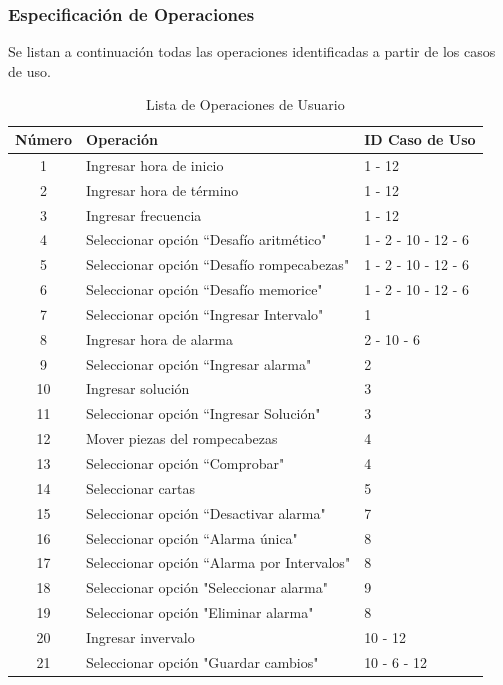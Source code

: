 \subsubsection{Especificación de Operaciones}
Se listan a continuación todas las operaciones identificadas a partir de los casos de uso.
\begin{table}[H]
    \centering
    \caption{Lista de Operaciones de Usuario}
    \vspace{5pt}
    \begin{tabular}{| c | l | l |}
        \hline
        Número & Operación & ID Caso de Uso \\
        \hline
        1 & Ingresar hora de inicio & 1 - 12 \\
        \hline
        2 & Ingresar hora de término & 1 - 12 \\
        \hline
        3 & Ingresar frecuencia & 1 - 12 \\
        \hline
        4 & Seleccionar opción ``Desafío aritmético" & 1 - 2 - 10 - 12 - 6 \\
        \hline
        5 & Seleccionar opción ``Desafío rompecabezas" & 1 - 2 - 10 - 12 - 6 \\
        \hline
        6 & Seleccionar opción ``Desafío memorice" & 1 - 2 - 10 - 12 - 6 \\
        \hline
        7 & Seleccionar opción ``Ingresar Intervalo" & 1 \\
        \hline
        8 & Ingresar hora de alarma & 2 - 10 - 6 \\
        \hline
        9 & Seleccionar opción ``Ingresar alarma" & 2 \\
        \hline
        10 & Ingresar solución & 3 \\
        \hline
        11 & Seleccionar opción ``Ingresar Solución" & 3 \\
        \hline
        12 & Mover piezas del rompecabezas & 4 \\
        \hline
        13 & Seleccionar opción ``Comprobar" & 4 \\
        \hline
        14 & Seleccionar cartas & 5 \\
        \hline
        15 & Seleccionar opción ``Desactivar alarma" & 7 \\
        \hline
        16 & Seleccionar opción ``Alarma única" & 8 \\
        \hline
        17 & Seleccionar opción ``Alarma por Intervalos" & 8 \\
        \hline
        18 & Seleccionar opción "Seleccionar alarma" & 9 \\
        \hline
        19 & Seleccionar opción "Eliminar alarma" & 8 \\
        \hline
        20 & Ingresar invervalo & 10 - 12 \\
        \hline
        21 & Seleccionar opción "Guardar cambios" & 10 - 6 - 12 \\
        \hline
    \end{tabular}    
    
    \label{table:2}
\end{table}

